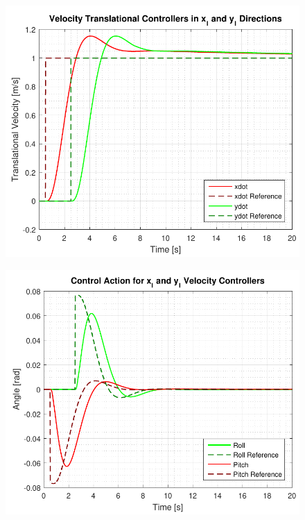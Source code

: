 \begin{minipage}{\linewidth}
    \begin{minipage}{0.5\linewidth}
        \begin{figure}[H]
            \includegraphics[scale=.58]{figures/velocityControllersXY}
            \centering			
            \label{fig:velocityControllersXY}
        \end{figure}
    \end{minipage}
    \hspace{0.03\linewidth}
    \begin{minipage}{0.5\linewidth}
        \begin{figure}[H]
            \includegraphics[scale=.58]{figures/velocityControllersXYAction}

\end{figure}
\end{minipage}
\end{minipage}
